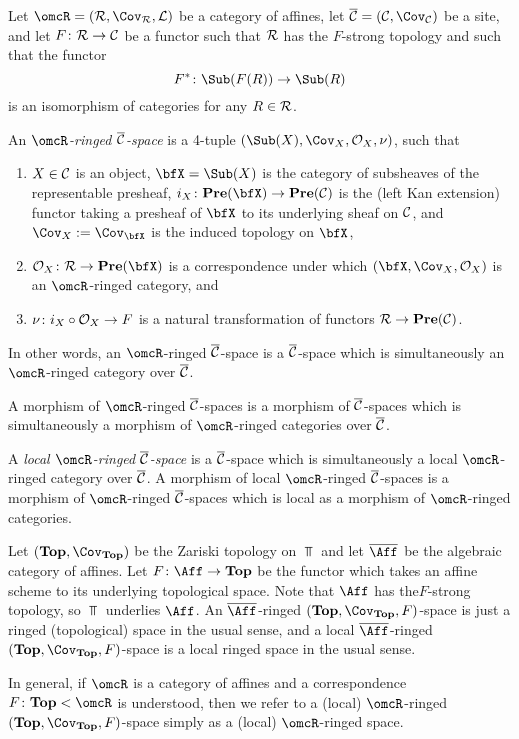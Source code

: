 \documentclass[10pt]{amsart}
\begin{document}
\begin{definition}

Let $\omcR=(\mcR,\Cov_\mcR,\mcL)$ be a category of affines, let $\ol{\mcC}=(\mcC,\Cov_\mcC)$ be a site, and let $F\colon\mathcal{R}\rightarrow\mathcal{C}$ be a functor such that $\mathcal{R}$ has the $F$-strong topology and such that the functor $$F^*\taking\Sub(F(R))\to\Sub(R)$$ is an isomorphism of categories for any $R\in \mathcal{R}$.  

An {\em $\omcR$-ringed $\overline{\mathcal{C}}$-space} is a 4-tuple $(\Sub(X),\Cov_X,\mcO_X,\nu)$, such that \begin{enumerate}\item  $X\in\mathcal{C}$ is an object, $\bfX=\Sub(X)$ is the category of subsheaves of the representable presheaf, $i_X\taking\Pre(\bfX)\to\Pre(\mcC)$ is the (left Kan extension) functor taking a presheaf of $\bfX$ to its underlying sheaf on $\mathcal{C}$, and $\Cov_X:=\Cov_{\bfX}$ is the induced topology on $\bfX$, \item $\mcO_X\taking\mcR\to\Pre(\bfX)$ is a correspondence under which $(\bfX,\Cov_X,\mcO_X)$ is an $\omcR$-ringed category, and \item $\nu\colon i_X\circ\mathcal{O}_X\rightarrow F$ is a natural transformation of functors $\mathcal{R}\rightarrow{\bf Pre}(\mathcal{C})$. \end{enumerate}  In other words, an $\omcR$-ringed $\overline{\mathcal{C}}$-space is a $\overline{\mathcal{C}}$-space which is simultaneously an $\omcR$-ringed category over $\overline{\mathcal{C}}$.

A morphism of $\omcR$-ringed $\overline{\mathcal{C}}$-spaces is a morphism of $\overline{\mathcal{C}}$-spaces which is simultaneously a morphism of $\omcR$-ringed categories over $\overline{\mathcal{C}}$.

A {\em local $\omcR$-ringed $\overline{\mathcal{C}}$-space} is a $\overline{\mathcal{C}}$-space which is simultaneously a local $\omcR$-ringed category over $\overline{\mathcal{C}}$.  A morphism of local $\omcR$-ringed $\overline{\mathcal{C}}$-spaces is a morphism of $\omcR$-ringed $\overline{\mathcal{C}}$-spaces which is local as a morphism of $\omcR$-ringed categories.

\end{definition}

\begin{example}

Let $(\Top,\Cov_\Top)$ be the Zariski topology on $\Top$ and let $\ol{\Aff}$ be the algebraic category of affines.  Let $F\taking\Aff\to\Top$ be the functor which takes an affine scheme to its underlying topological space.  Note that $\Aff$ has the$F$-strong topology, so $\Top$ underlies $\Aff$.  An $\ol{\Aff}$-ringed $(\Top,\Cov_\Top,F)$-space is just a ringed (topological) space in the usual sense, and a local $\ol{\Aff}$-ringed $(\Top,\Cov_\Top,F)$-space is a local ringed space in the usual sense.

In general, if $\omcR$ is a category of affines and a correspondence $F\taking\Top<\omcR$ is understood, then we refer to a (local) $\omcR$-ringed $(\Top,\Cov_\Top,F)$-space simply as a (local) $\omcR$-ringed space.

\end{example}
\end{document}
